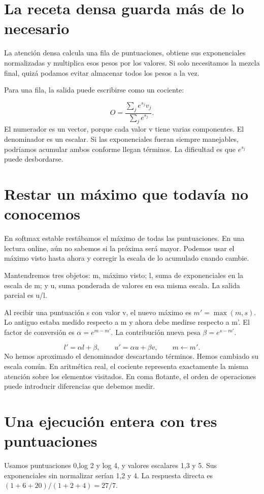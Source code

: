 \documentclass[12pt,a4paper,oneside]{report}
\begin{document}
\section{La receta densa guarda más de lo necesario}
La atención densa calcula una fila de puntuaciones, obtiene sus exponenciales normalizadas y multiplica esos pesos por los valores. Si solo necesitamos la mezcla final, quizá podamos evitar almacenar todos los pesos a la vez.

Para una fila, la salida puede escribirse como un cociente:

\[
O=\frac{\sum_j e^{s_j}v_j}{\sum_j e^{s_j}}.
\]
El numerador es un vector, porque cada valor v tiene varias componentes. El denominador es un escalar. Si las exponenciales fueran siempre manejables, podríamos acumular ambos conforme llegan términos. La dificultad es que $e^{s_j}$ puede desbordarse.

\section{Restar un máximo que todavía no conocemos}
En softmax estable restábamos el máximo de todas las puntuaciones. En una lectura online, aún no sabemos si la próxima será mayor. Podemos usar el máximo visto hasta ahora y corregir la escala de lo acumulado cuando cambie.

Mantendremos tres objetos: m, máximo visto; l, suma de exponenciales en la escala de m; y u, suma ponderada de valores en esa misma escala. La salida parcial es u/l.

Al recibir una puntuación s con valor v, el nuevo máximo es $m'=\max(m,s)$. Lo antiguo estaba medido respecto a m y ahora debe medirse respecto a m'. El factor de conversión es $\alpha=e^{m-m'}$. La contribución nueva pesa $\beta=e^{s-m'}$.

\[
l'=\alpha l+\beta,\qquad u'=\alpha u+\beta v,\qquad m\leftarrow m'.
\]
No hemos aproximado el denominador descartando términos. Hemos cambiado su escala común. En aritmética real, el cociente representa exactamente la misma atención sobre los elementos visitados. En coma flotante, el orden de operaciones puede introducir diferencias que debemos medir.

\section{Una ejecución entera con tres puntuaciones}
Usamos puntuaciones 0,log 2 y log 4, y valores escalares 1,3 y 5. Sus exponenciales sin normalizar serían 1,2 y 4. La respuesta directa es $(1+6+20)/(1+2+4)=27/7$.
\end{document}
